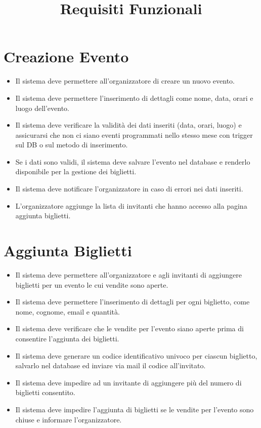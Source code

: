 \documentclass[a4paper,12pt]{article}
\title{\textcolor{titlecolor}{\Huge Requisiti Funzionali \vspace{0.2cm}}}
\author{}
\date{}
\begin{document}
\maketitle

\section*{\textcolor{sectioncolor}{Creazione Evento}}
\textcolor{textcolor}{
\begin{itemize}
    \item Il sistema deve permettere all’organizzatore di creare un nuovo evento.
    \item Il sistema deve permettere l'inserimento di dettagli come nome, data, orari e luogo dell'evento.
    \item Il sistema deve verificare la validità dei dati inseriti (data, orari, luogo) e assicurarsi che non ci siano eventi programmati nello stesso mese con trigger sul DB o sul metodo di inserimento.
    \item Se i dati sono validi, il sistema deve salvare l'evento nel database e renderlo disponibile per la gestione dei biglietti.
    \item Il sistema deve notificare l’organizzatore in caso di errori nei dati inseriti.
    \item L’organizzatore aggiunge la lista di invitanti che hanno accesso alla pagina aggiunta biglietti.
\end{itemize}
}

\section*{\textcolor{sectioncolor}{Aggiunta Biglietti}}
\textcolor{textcolor}{
\begin{itemize}
    \item Il sistema deve permettere all’organizzatore e agli invitanti di aggiungere biglietti per un evento le cui vendite sono aperte.
    \item Il sistema deve permettere l'inserimento di dettagli per ogni biglietto, come nome, cognome, email e quantità.
    \item Il sistema deve verificare che le vendite per l'evento siano aperte prima di consentire l'aggiunta dei biglietti.
    \item Il sistema deve generare un codice identificativo univoco per ciascun biglietto, salvarlo nel database ed inviare via mail il codice all’invitato.
    \item Il sistema deve impedire ad un invitante di aggiungere più del numero di biglietti consentito.
    \item Il sistema deve impedire l'aggiunta di biglietti se le vendite per l'evento sono chiuse e informare l’organizzatore.
\end{itemize}
}
\end{document}
